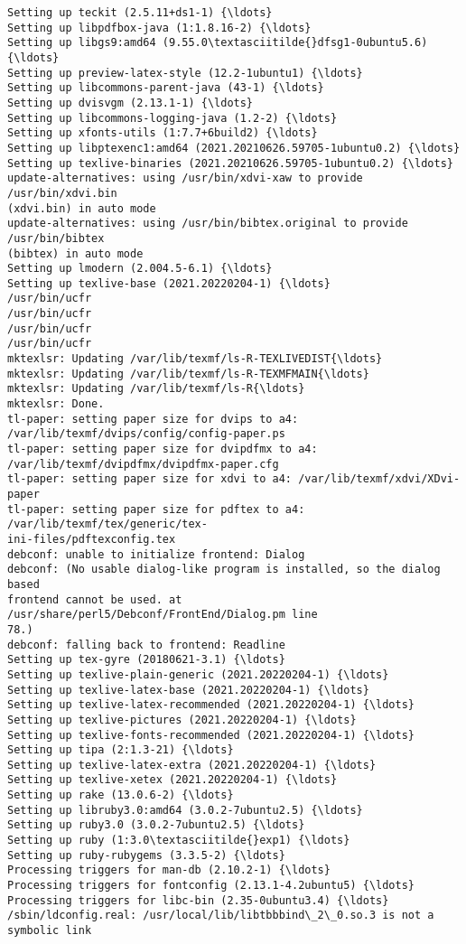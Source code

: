 \documentclass[11pt]{article}
\begin{document}
\begin{Verbatim}[commandchars=\\\{\}]
Setting up teckit (2.5.11+ds1-1) {\ldots}
Setting up libpdfbox-java (1:1.8.16-2) {\ldots}
Setting up libgs9:amd64 (9.55.0\textasciitilde{}dfsg1-0ubuntu5.6) {\ldots}
Setting up preview-latex-style (12.2-1ubuntu1) {\ldots}
Setting up libcommons-parent-java (43-1) {\ldots}
Setting up dvisvgm (2.13.1-1) {\ldots}
Setting up libcommons-logging-java (1.2-2) {\ldots}
Setting up xfonts-utils (1:7.7+6build2) {\ldots}
Setting up libptexenc1:amd64 (2021.20210626.59705-1ubuntu0.2) {\ldots}
Setting up texlive-binaries (2021.20210626.59705-1ubuntu0.2) {\ldots}
update-alternatives: using /usr/bin/xdvi-xaw to provide /usr/bin/xdvi.bin
(xdvi.bin) in auto mode
update-alternatives: using /usr/bin/bibtex.original to provide /usr/bin/bibtex
(bibtex) in auto mode
Setting up lmodern (2.004.5-6.1) {\ldots}
Setting up texlive-base (2021.20220204-1) {\ldots}
/usr/bin/ucfr
/usr/bin/ucfr
/usr/bin/ucfr
/usr/bin/ucfr
mktexlsr: Updating /var/lib/texmf/ls-R-TEXLIVEDIST{\ldots}
mktexlsr: Updating /var/lib/texmf/ls-R-TEXMFMAIN{\ldots}
mktexlsr: Updating /var/lib/texmf/ls-R{\ldots}
mktexlsr: Done.
tl-paper: setting paper size for dvips to a4:
/var/lib/texmf/dvips/config/config-paper.ps
tl-paper: setting paper size for dvipdfmx to a4:
/var/lib/texmf/dvipdfmx/dvipdfmx-paper.cfg
tl-paper: setting paper size for xdvi to a4: /var/lib/texmf/xdvi/XDvi-paper
tl-paper: setting paper size for pdftex to a4: /var/lib/texmf/tex/generic/tex-
ini-files/pdftexconfig.tex
debconf: unable to initialize frontend: Dialog
debconf: (No usable dialog-like program is installed, so the dialog based
frontend cannot be used. at /usr/share/perl5/Debconf/FrontEnd/Dialog.pm line
78.)
debconf: falling back to frontend: Readline
Setting up tex-gyre (20180621-3.1) {\ldots}
Setting up texlive-plain-generic (2021.20220204-1) {\ldots}
Setting up texlive-latex-base (2021.20220204-1) {\ldots}
Setting up texlive-latex-recommended (2021.20220204-1) {\ldots}
Setting up texlive-pictures (2021.20220204-1) {\ldots}
Setting up texlive-fonts-recommended (2021.20220204-1) {\ldots}
Setting up tipa (2:1.3-21) {\ldots}
Setting up texlive-latex-extra (2021.20220204-1) {\ldots}
Setting up texlive-xetex (2021.20220204-1) {\ldots}
Setting up rake (13.0.6-2) {\ldots}
Setting up libruby3.0:amd64 (3.0.2-7ubuntu2.5) {\ldots}
Setting up ruby3.0 (3.0.2-7ubuntu2.5) {\ldots}
Setting up ruby (1:3.0\textasciitilde{}exp1) {\ldots}
Setting up ruby-rubygems (3.3.5-2) {\ldots}
Processing triggers for man-db (2.10.2-1) {\ldots}
Processing triggers for fontconfig (2.13.1-4.2ubuntu5) {\ldots}
Processing triggers for libc-bin (2.35-0ubuntu3.4) {\ldots}
/sbin/ldconfig.real: /usr/local/lib/libtbbbind\_2\_0.so.3 is not a symbolic link


\end{Verbatim}
\end{document}
